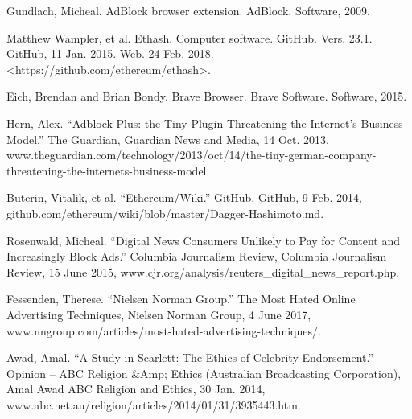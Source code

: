 \documentclass[10pt, conference, compsocconf]{IEEEtran}
\begin{document}
%
%
%
\begin{thebibliography}{1}
 Gundlach, Micheal. AdBlock browser extension. AdBlock. Software, 2009.

Matthew Wampler, et al. Ethash. Computer software. GitHub. Vers. 23.1. GitHub, 11 Jan. 2015. Web. 24 Feb. 2018. <https://github.com/ethereum/ethash>. 

 Eich, Brendan and Brian Bondy. Brave Browser. Brave Software. Software, 2015.

 Hern, Alex. “Adblock Plus: the Tiny Plugin Threatening the Internet's Business Model.” The Guardian, Guardian News and Media, 14 Oct. 2013, www.theguardian.com/technology/2013/oct/14/the-tiny-german-company-threatening-the-internets-business-model.

 Buterin, Vitalik, et al. “Ethereum/Wiki.” GitHub, GitHub, 9 Feb. 2014, github.com/ethereum/wiki/blob/master/Dagger-Hashimoto.md. 

 Rosenwald, Micheal. “Digital News Consumers Unlikely to Pay for Content and Increasingly Block Ads.” Columbia Journalism Review, Columbia Journalism Review, 15 June 2015, www.cjr.org/analysis/reuters\_digital\_news\_report.php.

 Fessenden, Therese. “Nielsen Norman Group.” The Most Hated Online Advertising Techniques, Nielsen Norman Group, 4 June 2017, www.nngroup.com/articles/most-hated-advertising-techniques/.

 Awad, Amal. “A Study in Scarlett: The Ethics of Celebrity Endorsement.” – Opinion – ABC Religion \&Amp; Ethics (Australian Broadcasting Corporation), Amal Awad ABC Religion and Ethics, 30 Jan. 2014, www.abc.net.au/religion/articles/2014/01/31/3935443.htm.



\end{thebibliography}
\end{document}
